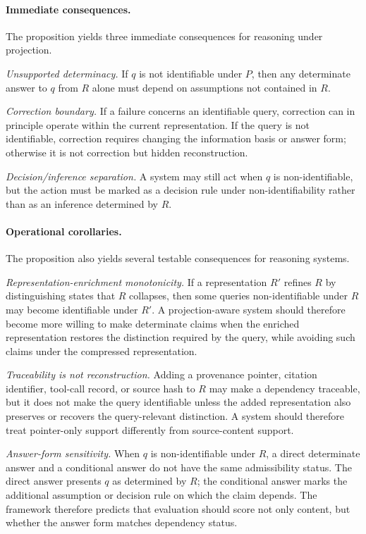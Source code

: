 \documentclass[11pt]{article}
\begin{document}
\paragraph{Immediate consequences.}
The proposition yields three immediate consequences for reasoning under projection.

\emph{Unsupported determinacy.}
If $q$ is not identifiable under $P$, then any determinate answer to $q$ from $R$ alone must depend on assumptions not contained in $R$.

\emph{Correction boundary.}
If a failure concerns an identifiable query, correction can in principle operate within the current representation. If the query is not identifiable, correction requires changing the information basis or answer form; otherwise it is not correction but hidden reconstruction.

\emph{Decision/inference separation.}
A system may still act when $q$ is non-identifiable, but the action must be marked as a decision rule under non-identifiability rather than as an inference determined by $R$.

\paragraph{Operational corollaries.}
The proposition also yields several testable consequences for reasoning systems.

\emph{Representation-enrichment monotonicity.}
If a representation $R'$ refines $R$ by distinguishing states that $R$ collapses, then some queries non-identifiable under $R$ may become identifiable under $R'$. A projection-aware system should therefore become more willing to make determinate claims when the enriched representation restores the distinction required by the query, while avoiding such claims under the compressed representation.

\emph{Traceability is not reconstruction.}
Adding a provenance pointer, citation identifier, tool-call record, or source hash to $R$ may make a dependency traceable, but it does not make the query identifiable unless the added representation also preserves or recovers the query-relevant distinction. A system should therefore treat pointer-only support differently from source-content support.

\emph{Answer-form sensitivity.}
When $q$ is non-identifiable under $R$, a direct determinate answer and a conditional answer do not have the same admissibility status. The direct answer presents $q$ as determined by $R$; the conditional answer marks the additional assumption or decision rule on which the claim depends. The framework therefore predicts that evaluation should score not only content, but whether the answer form matches dependency status.
\end{document}
